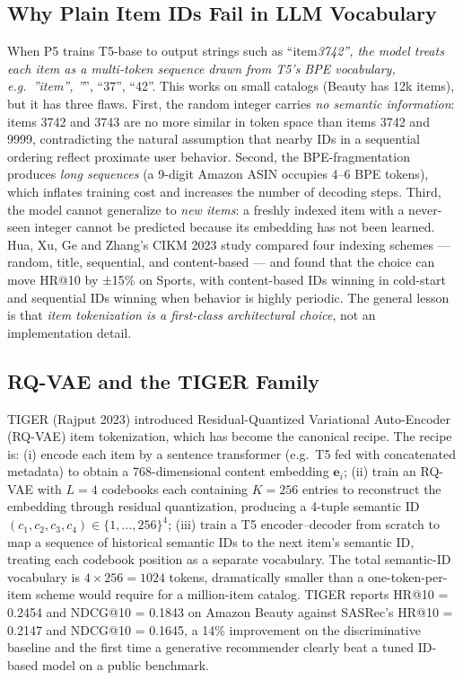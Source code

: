\subsection{Why Plain Item IDs Fail in LLM Vocabulary}\label{why-plain-item-ids-fail-in-llm-vocabulary}

When P5 trains T5-base to output strings such as ``item\emph{3742'', the model treats each item as a multi-token sequence drawn from T5's BPE vocabulary, e.g.~''item'', ''}'', ``37'', ``42''. This works on small catalogs (Beauty has 12k items), but it has three flaws. First, the random integer carries \emph{no semantic information}: items 3742 and 3743 are no more similar in token space than items 3742 and 9999, contradicting the natural assumption that nearby IDs in a sequential ordering reflect proximate user behavior. Second, the BPE-fragmentation produces \emph{long sequences} (a 9-digit Amazon ASIN occupies 4--6 BPE tokens), which inflates training cost and increases the number of decoding steps. Third, the model cannot generalize to \emph{new items}: a freshly indexed item with a never-seen integer cannot be predicted because its embedding has not been learned. Hua, Xu, Ge and Zhang's CIKM 2023 study compared four indexing schemes --- random, title, sequential, and content-based --- and found that the choice can move HR@10 by ±15\% on Sports, with content-based IDs winning in cold-start and sequential IDs winning when behavior is highly periodic. The general lesson is that \emph{item tokenization is a first-class architectural choice}, not an implementation detail.

\subsection{RQ-VAE and the TIGER Family}\label{rq-vae-and-the-tiger-family}

TIGER (Rajput 2023) introduced Residual-Quantized Variational Auto-Encoder (RQ-VAE) item tokenization, which has become the canonical recipe. The recipe is: (i) encode each item by a sentence transformer (e.g.~T5 fed with concatenated metadata) to obtain a 768-dimensional content embedding \(\mathbf{e}_i\); (ii) train an RQ-VAE with \(L=4\) codebooks each containing \(K=256\) entries to reconstruct the embedding through residual quantization, producing a 4-tuple semantic ID \((c_1, c_2, c_3, c_4) \in \{1, \dots, 256\}^4\); (iii) train a T5 encoder--decoder from scratch to map a sequence of historical semantic IDs to the next item's semantic ID, treating each codebook position as a separate vocabulary. The total semantic-ID vocabulary is \(4 \times 256 = 1024\) tokens, dramatically smaller than a one-token-per-item scheme would require for a million-item catalog. TIGER reports HR@10 = 0.2454 and NDCG@10 = 0.1843 on Amazon Beauty against SASRec's HR@10 = 0.2147 and NDCG@10 = 0.1645, a 14\% improvement on the discriminative baseline and the first time a generative recommender clearly beat a tuned ID-based model on a public benchmark.

